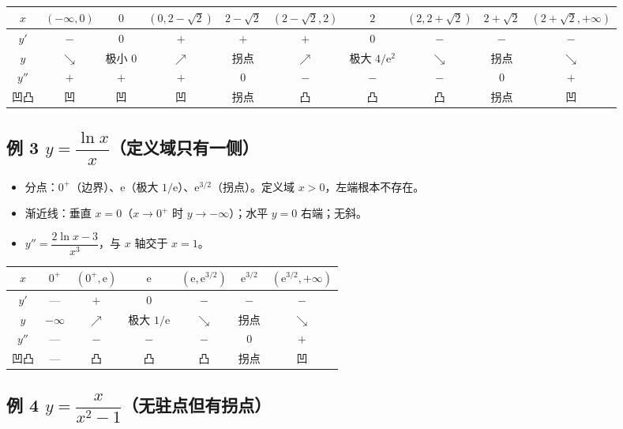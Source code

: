 \documentclass[11pt,a4paper]{ctexart}
\newcommand{\ee}{\mathrm{e}}
\begin{document}
\begin{center}
\footnotesize\setlength{\tabcolsep}{1.5pt}
\begin{tabular}{@{}c|ccccccccc@{}}
$x$ & $(-\infty,0)$ & $0$ & $(0,2-\sqrt2)$ & $2-\sqrt2$ & $(2-\sqrt2,2)$ & $2$ & $(2,2+\sqrt2)$ & $2+\sqrt2$ & $(2+\sqrt2,+\infty)$ \\
\hline
$y'$ & $-$ & $0$ & $+$ & $+$ & $+$ & $0$ & $-$ & $-$ & $-$ \\
$y$ & $\searrow$ & 极小 $0$ & $\nearrow$ & 拐点 & $\nearrow$ & 极大 $4/\ee^2$ & $\searrow$ & 拐点 & $\searrow$ \\
$y''$ & $+$ & $+$ & $+$ & $0$ & $-$ & $-$ & $-$ & $0$ & $+$ \\
凹凸 & 凹 & 凹 & 凹 & 拐点 & 凸 & 凸 & 凸 & 拐点 & 凹 \\
\end{tabular}
\end{center}

\subsection{例 3 $y=\dfrac{\ln x}{x}$（定义域只有一侧）}

\begin{itemize}[label=$\bullet$,leftmargin=1.5em]
\item 分点：$0^+$（边界）、$\ee$（极大 $1/\ee$）、$\ee^{3/2}$（拐点）。定义域 $x>0$，左端根本不存在。
\item 渐近线：垂直 $x=0$（$x\to0^+$ 时 $y\to-\infty$）；水平 $y=0$ 右端；无斜。
\item $y''=\dfrac{2\ln x-3}{x^3}$，与 $x$ 轴交于 $x=1$。
\end{itemize}

\begin{center}
\footnotesize\setlength{\tabcolsep}{1.5pt}
\begin{tabular}{@{}c|cccccc@{}}
$x$ & $0^+$ & $(0^+,\ee)$ & $\ee$ & $(\ee,\ee^{3/2})$ & $\ee^{3/2}$ & $(\ee^{3/2},+\infty)$ \\
\hline
$y'$ & — & $+$ & $0$ & $-$ & $-$ & $-$ \\
$y$ & $-\infty$ & $\nearrow$ & 极大 $1/\ee$ & $\searrow$ & 拐点 & $\searrow$ \\
$y''$ & — & $-$ & $-$ & $-$ & $0$ & $+$ \\
凹凸 & — & 凸 & 凸 & 凸 & 拐点 & 凹 \\
\end{tabular}
\end{center}

\subsection{例 4 $y=\dfrac{x}{x^2-1}$（无驻点但有拐点）}
\end{document}
